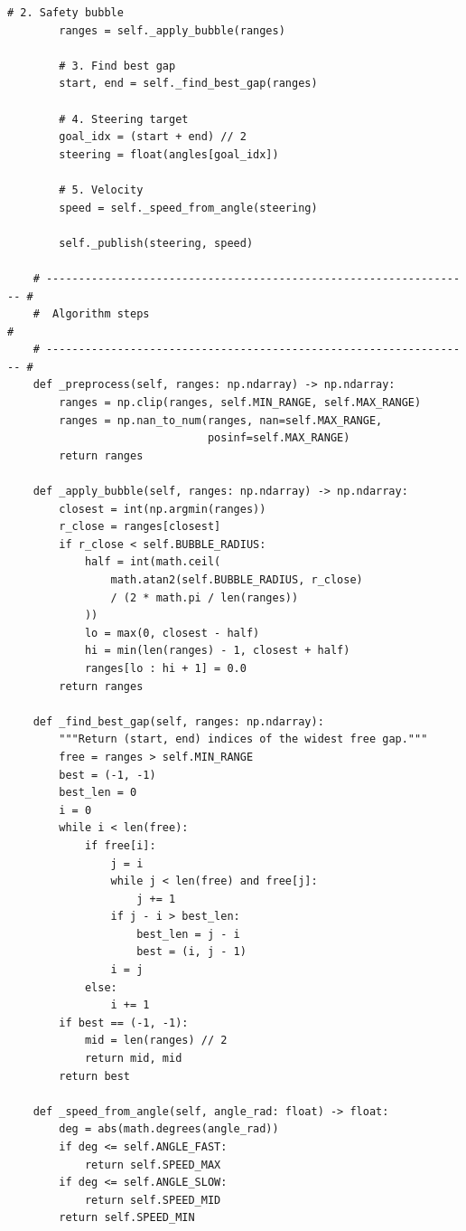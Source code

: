 \begin{lstlisting}[language=Python3,
                   caption={FTG-Hauptknoten (vereinfacht)},
                   label={lst:ftg_node}]
        # 2. Safety bubble
        ranges = self._apply_bubble(ranges)

        # 3. Find best gap
        start, end = self._find_best_gap(ranges)

        # 4. Steering target
        goal_idx = (start + end) // 2
        steering = float(angles[goal_idx])

        # 5. Velocity
        speed = self._speed_from_angle(steering)

        self._publish(steering, speed)

    # ------------------------------------------------------------------ #
    #  Algorithm steps                                                     #
    # ------------------------------------------------------------------ #
    def _preprocess(self, ranges: np.ndarray) -> np.ndarray:
        ranges = np.clip(ranges, self.MIN_RANGE, self.MAX_RANGE)
        ranges = np.nan_to_num(ranges, nan=self.MAX_RANGE,
                               posinf=self.MAX_RANGE)
        return ranges

    def _apply_bubble(self, ranges: np.ndarray) -> np.ndarray:
        closest = int(np.argmin(ranges))
        r_close = ranges[closest]
        if r_close < self.BUBBLE_RADIUS:
            half = int(math.ceil(
                math.atan2(self.BUBBLE_RADIUS, r_close)
                / (2 * math.pi / len(ranges))
            ))
            lo = max(0, closest - half)
            hi = min(len(ranges) - 1, closest + half)
            ranges[lo : hi + 1] = 0.0
        return ranges

    def _find_best_gap(self, ranges: np.ndarray):
        """Return (start, end) indices of the widest free gap."""
        free = ranges > self.MIN_RANGE
        best = (-1, -1)
        best_len = 0
        i = 0
        while i < len(free):
            if free[i]:
                j = i
                while j < len(free) and free[j]:
                    j += 1
                if j - i > best_len:
                    best_len = j - i
                    best = (i, j - 1)
                i = j
            else:
                i += 1
        if best == (-1, -1):
            mid = len(ranges) // 2
            return mid, mid
        return best

    def _speed_from_angle(self, angle_rad: float) -> float:
        deg = abs(math.degrees(angle_rad))
        if deg <= self.ANGLE_FAST:
            return self.SPEED_MAX
        if deg <= self.ANGLE_SLOW:
            return self.SPEED_MID
        return self.SPEED_MIN


\end{lstlisting}
